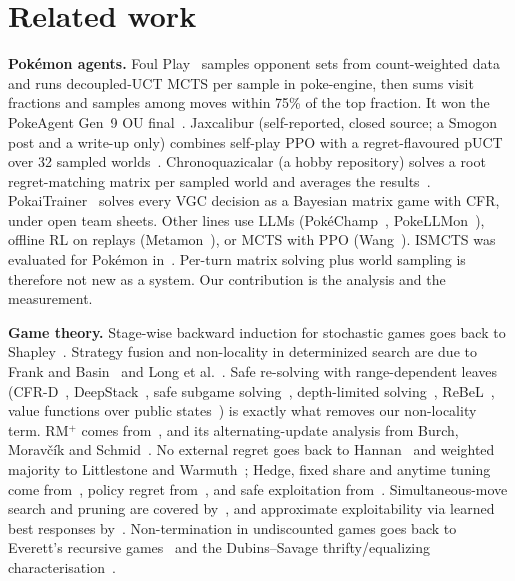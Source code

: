 \documentclass[10pt]{article}
\theoremstyle{plain}
\theoremstyle{definition}
\theoremstyle{remark}
\begin{document}
\section{Related work}
\label{sec:related}
\textbf{Pok\'emon agents.} Foul Play~\cite{foulplay} samples opponent sets from count-weighted data and runs decoupled-UCT MCTS per sample in poke-engine, then sums visit fractions and samples among moves within 75\% of the top fraction. It won the PokeAgent Gen~9 OU final~\cite{pokeagent}. Jaxcalibur (self-reported, closed source; a Smogon post and a write-up only) combines self-play PPO with a regret-flavoured pUCT over 32 sampled worlds~\cite{jaxcalibur}.
Chronoquazicalar (a hobby repository) solves a root regret-matching matrix per sampled world and averages the results~\cite{chrono}.
PokaiTrainer~\cite{Yu26} solves every VGC decision as a Bayesian matrix game with CFR, under open team sheets. Other lines use LLMs (Pok\'eChamp~\cite{Kar25}, PokeLLMon~\cite{hu2024pokellmon}), offline RL on replays (Metamon~\cite{grigsby2025metamon}), or MCTS with PPO (Wang~\cite{wang2024randbats}). ISMCTS was evaluated for Pok\'emon in~\cite{Iha18}. Per-turn matrix solving plus world sampling is therefore not new as a system. Our contribution is the analysis and the measurement.

\textbf{Game theory.} Stage-wise backward induction for stochastic games goes back to Shapley~\cite{Shapley53}. Strategy fusion and non-locality in determinized search are due to Frank and Basin~\cite{Fra98} and Long et al.~\cite{Lon10}. Safe re-solving with range-dependent leaves (CFR-D~\cite{CFRD}, DeepStack~\cite{Mor17}, safe subgame solving~\cite{Bro17}, depth-limited solving~\cite{Bro18}, ReBeL~\cite{Bro20}, value functions over public states~\cite{Kov23}) is exactly what removes our non-locality term. RM$^+$ comes from~\cite{Tam14,Tammelin15}, and its alternating-update analysis from Burch, Moravčík and Schmid~\cite{BMS19}. No external regret goes back to Hannan~\cite{Hannan57} and weighted majority to Littlestone and Warmuth~\cite{LW94}; Hedge, fixed share and anytime tuning come from~\cite{FS97,HW98,CBL06}, policy regret from~\cite{Aro12b}, and safe exploitation from~\cite{Gan15,Joh09}. Simultaneous-move search and pruning are covered by~\cite{Saf12,Bos16,Lis13}, and approximate exploitability via learned best responses by~\cite{Tim20}. Non-termination in undiscounted games goes back to Everett's recursive games~\cite{Everett57} and the Dubins--Savage thrifty/equalizing characterisation~\cite{DS65,MS96}.
\end{document}
